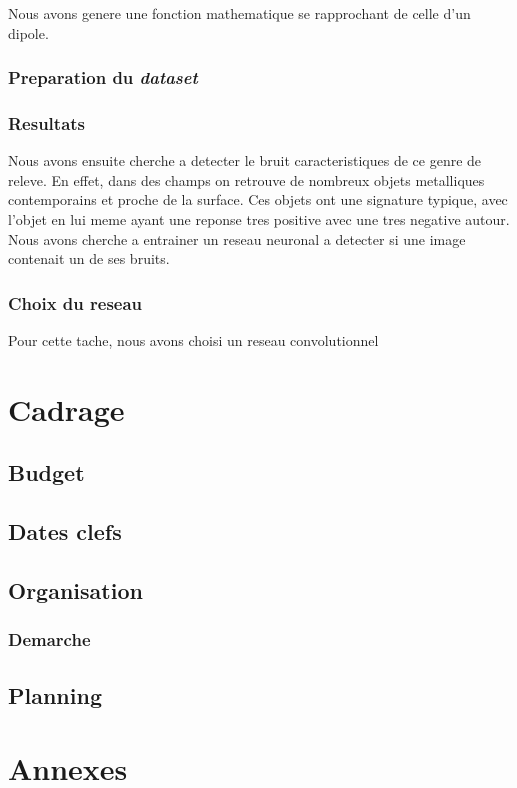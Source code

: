\documentclass[a4paper, 12pt, titlepage, oneside]{article}
\begin{document}
	Nous avons genere une fonction mathematique se rapprochant de celle d'un dipole. 

	\subsubsection{Preparation du \textit{dataset}}
	\subsubsection{Resultats}
	Nous avons ensuite cherche a detecter le bruit caracteristiques de ce genre de releve. En effet, dans des champs on retrouve de nombreux objets metalliques contemporains
	et proche de la surface. Ces objets ont une signature typique, avec l'objet en lui meme ayant une reponse tres positive avec une  tres negative autour. 
	Nous avons cherche a entrainer un reseau neuronal a detecter si une image contenait un de ses bruits.
	\subsubsection{Choix du reseau}
	Pour cette tache, nous avons choisi un reseau convolutionnel
	\newpage

\section{Cadrage}
	\subsection{Budget}
	\subsection{Dates clefs}
	\subsection{Organisation}
	\subsubsection{Demarche}
	\subsection{Planning}
	\newpage
\section{Annexes}
\end{document}
